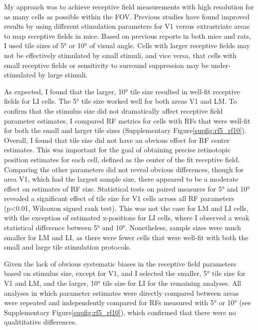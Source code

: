 My approach was to achieve receptive field measurements with high resolution for as many cells as possible within the FOV. Previous studies have found improved results by using different stimulation parameters for V1 versus extrastriate areas to map receptive fields in mice\cite{DeVries2020, Allen2016}. Based on previous reports in both mice and rats\cite{Girman1999a, Niell2008,Vermaercke2014,Tafazoli2017,DeVries2020}, I used tile sizes of \ang{5} or \ang{10} of visual angle. Cells with larger receptive fields may not be effectively stimulated by small stimuli, and vice versa, that cells with small receptive fields or sensitivity to surround suppression may be under-stimulated by large stimuli. 

As expected, I found that the larger, \ang{10} tile size resulted in well-fit receptive fields for LI cells. The \ang{5} tile size worked well for both areas V1 and LM. To confirm that the stimulus size did not dramatically affect receptive field parameter estimates, I compared RF metrics for cells with RFs that were well-fit for both the small and larger tile sizes (Supplementary Figure\ref{supfig:rf5_rf10}). Overall, I found that tile size did not have an obvious effect for RF center estimates. This was important for the goal of obtaining precise retinotopic position estimates for each cell, defined as the center of the fit receptive field. Comparing the other parameters did not reveal obvious differences, though for area V1, which had the largest sample size, there appeared to be a moderate effect on estimates of RF size. Statistical tests on paired measures for \ang{5} and \ang{10} revealed a significant effect of tile size for V1 cells across all RF parameters (p<0.01, Wilcoxon signed rank test). This was not the case for LM and LI cells, with the exception of estimated x-positions for LI cells, where I observed a weak statistical difference between \ang{5} and \ang{10}. Nonetheless, sample sizes were much smaller for LM and LI, as there were fewer cells that were well-fit with both the small and large tile stimulation protocols.

Given the lack of obvious systematic biases in the receptive field parameters based on stimulus size, except for V1, and I selected the smaller, \ang{5} tile size for V1 and LM, and the larger, \ang{10} tile size for LI for the remaining analyses. All analyses in which parameter estimates were directly compared between areas were repeated and independently compared for RFs measured with \ang{5} or \ang{10} (see Supplementary Figure\ref{supfig:rf5_rf10}), which confirmed that there were no qualititative differences. 

